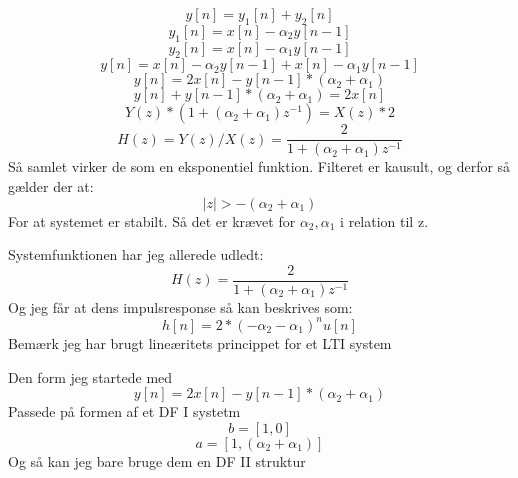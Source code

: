 \begin{EksamensOpgaver}
\begin{Eksamenssæt}[2024 Ordinær]
\begin{eksamensOpgave}
        \end{eksamensOpgave}
        \begin{eksamensOpgave}
            \begin{UnderOpgave}
                
            \end{UnderOpgave}
            \[y[n] = y_1[n] + y_2[n]\]
            \[y_1[n] = x[n] - \alpha_2y[n - 1]\]
            \[y_2[n] = x[n] - \alpha_1y[n - 1]\]
            \[y[n] = x[n] - \alpha_2y[n - 1] + x[n] - \alpha_1y[n - 1]\]
            \[y[n] = 2x[n] - y[n - 1] * (\alpha_2 + \alpha_1)\]
            \[y[n] + y[n - 1] * (\alpha_2 + \alpha_1) = 2x[n]\]
            \[Y(z) * (1 + (\alpha_2 + \alpha_1)z^{-1}) = X(z)*2\]
            \[H(z) = Y(z)/X(z) = \frac{2}{1 + (\alpha_2 + \alpha_1)z^{-1}}\]
            Så samlet virker de som en eksponentiel funktion. Filteret er kausult, og derfor så gælder der at: 
            \[|z| > - (\alpha_2 + \alpha_1)\]
            For at systemet er stabilt. Så det er krævet for $\alpha_2, \alpha_1$ i relation til z.
            \begin{UnderOpgave}
                Systemfunktionen har jeg allerede udledt: 
                \[H(z) = \frac{2}{1 + (\alpha_2 + \alpha_1)z^{-1}}\]
                Og jeg får at dens impulsresponse så kan beskrives som: 
                \[h[n] = 2 * (- \alpha_2 - \alpha_1)^nu[n]\]
                Bemærk jeg har brugt lineæritets princippet for et LTI system
            \end{UnderOpgave}
            \begin{UnderOpgave}
                Den form jeg startede med
                \[y[n] = 2x[n] - y[n - 1] * (\alpha_2 + \alpha_1)\]
                Passede på formen af et DF I systetm
                \[b = [1, 0]\]
                \[a = [1, (\alpha_2 + \alpha_1)]\]
                Og så kan jeg bare bruge dem en DF II struktur
                \\


\end{UnderOpgave}
\end{eksamensOpgave}
\end{Eksamenssæt}
\end{EksamensOpgaver}
